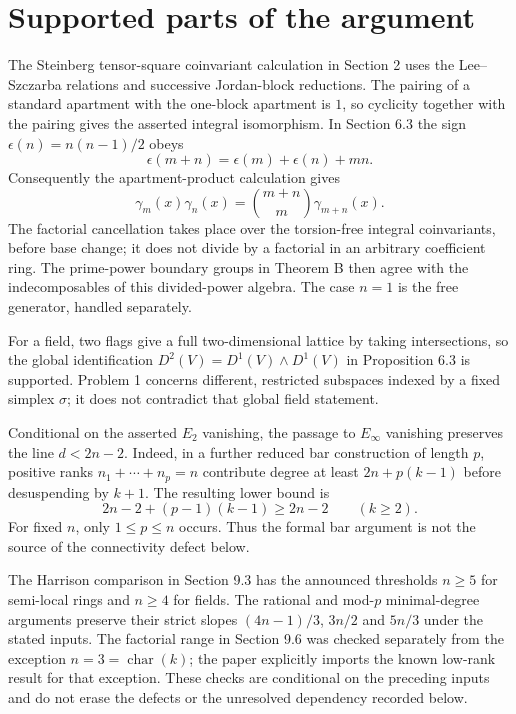 \documentclass[10pt]{article}
\begin{document}
\section*{Supported parts of the argument}
The Steinberg tensor-square coinvariant calculation in Section 2 uses the Lee–Szczarba relations and successive Jordan-block reductions. The pairing of a standard apartment with the one-block apartment is \(1\), so cyclicity together with the pairing gives the asserted integral isomorphism. In Section 6.3 the sign \(\epsilon(n)=n(n-1)/2\) obeys \[\epsilon(m+n)=\epsilon(m)+\epsilon(n)+mn.\] Consequently the apartment-product calculation gives \[\gamma_m(x)\gamma_n(x)=\binom{m+n}{m}\gamma_{m+n}(x).\] The factorial cancellation takes place over the torsion-free integral coinvariants, before base change; it does not divide by a factorial in an arbitrary coefficient ring. The prime-power boundary groups in Theorem B then agree with the indecomposables of this divided-power algebra. The case \(n=1\) is the free generator, handled separately.\par
For a field, two flags give a full two-dimensional lattice by taking intersections, so the global identification \(D^2(V)=D^1(V)\wedge D^1(V)\) in Proposition 6.3 is supported. Problem 1 concerns different, restricted subspaces indexed by a fixed simplex \(\sigma\); it does not contradict that global field statement.\par
Conditional on the asserted \(E_2\) vanishing, the passage to \(E_\infty\) vanishing preserves the line \(d<2n-2\). Indeed, in a further reduced bar construction of length \(p\), positive ranks \(n_1+\cdots+n_p=n\) contribute degree at least \(2n+p(k-1)\) before desuspending by \(k+1\). The resulting lower bound is \[2n-2+(p-1)(k-1)\geq 2n-2\qquad(k\geq2).\] For fixed \(n\), only \(1\leq p\leq n\) occurs. Thus the formal bar argument is not the source of the connectivity defect below.\par
The Harrison comparison in Section 9.3 has the announced thresholds \(n\geq5\) for semi-local rings and \(n\geq4\) for fields. The rational and mod-\(p\) minimal-degree arguments preserve their strict slopes \((4n-1)/3\), \(3n/2\) and \(5n/3\) under the stated inputs. The factorial range in Section 9.6 was checked separately from the exception \(n=3=\operatorname{char}(k)\); the paper explicitly imports the known low-rank result for that exception. These checks are conditional on the preceding inputs and do not erase the defects or the unresolved dependency recorded below.\par
\end{document}
